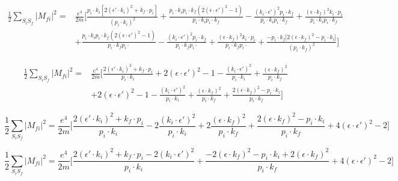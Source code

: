 \documentclass[a4]{article}
\begin{document}
    \begin{equation}
        \begin{aligned}
            \frac{1}{2} \sum_{S_i S_f} |M_{fi}|^2 = & \frac{e^4}{2m} \Bigg[ \frac{p_i \cdot k_i [2 (\epsilon' \cdot k_i)^2 + k_f \cdot p_i]}{(p_i \cdot k_i)^2} + \frac{p_i \cdot k_i p_i \cdot k_f (2 (\epsilon \cdot \epsilon')^2 - 1)}{p_i \cdot k_i p_i \cdot k_f} - \frac{(k_i \cdot \epsilon')^2 p_i \cdot k_f}{p_i \cdot k_i p_i \cdot k_f} + \frac{(\epsilon \cdot k_f)^2 k_i \cdot p_i}{p_i \cdot k_i p_i \cdot k_f} \\
            & + \frac{p_i \cdot k_i p_i \cdot k_f (2 (\epsilon \cdot \epsilon')^2 - 1)}{p_i \cdot k_f p_i \cdot} - \frac{(k_i \cdot \epsilon')^2 p_i \cdot k_f}{p_i \cdot k_f p_i \cdot} + \frac{(\epsilon \cdot k_f)^2 k_i \cdot p_i}{p_i \cdot k_f p_i \cdot} + \frac{- p_i \cdot k_f \big[ 2 (\epsilon \cdot k_f)^2 - p_i \cdot k_i \big]}{(p_i \cdot k_f)^2} \Bigg]
        \end{aligned}
    \end{equation}

    \begin{equation}
        \begin{aligned}
            \frac{1}{2} \sum_{S_i S_f} |M_{fi}|^2 = & \frac{e^4}{2m} \Bigg[ \frac{2 (\epsilon' \cdot k_i)^2 + k_f \cdot p_i}{p_i \cdot k_i} + 2 (\epsilon \cdot \epsilon')^2 - 1 - \frac{(k_i \cdot \epsilon')^2}{p_i \cdot k_i} + \frac{(\epsilon \cdot k_f)^2}{p_i \cdot k_f} \\
            & + 2 (\epsilon \cdot \epsilon')^2 - 1 - \frac{(k_i \cdot \epsilon')^2}{p_i \cdot k_i} + \frac{(\epsilon \cdot k_f)^2}{p_i \cdot k_f} + \frac{2 (\epsilon \cdot k_f)^2 - p_i \cdot k_i}{p_i \cdot k_f} \Bigg]
        \end{aligned}
    \end{equation}

    \begin{equation}
        \frac{1}{2} \sum_{S_i S_f} |M_{fi}|^2 = \frac{e^4}{2m} \Bigg[ \frac{2 (\epsilon' \cdot k_i)^2 + k_f \cdot p_i}{p_i \cdot k_i} - 2 \frac{(k_i \cdot \epsilon')^2}{p_i \cdot k_i} + 2 \frac{(\epsilon \cdot k_f)^2}{p_i \cdot k_f}
        + \frac{2 (\epsilon \cdot k_f)^2 - p_i \cdot k_i}{p_i \cdot k_f} + 4 (\epsilon \cdot \epsilon')^2 - 2 \Bigg]
    \end{equation}

    \begin{equation}
        \frac{1}{2} \sum_{S_i S_f} |M_{fi}|^2 = \frac{e^4}{2m} \Bigg[ \frac{2 (\epsilon' \cdot k_i)^2 + k_f \cdot p_i - 2 (k_i \cdot \epsilon')^2}{p_i \cdot k_i}
        + \frac{- 2 (\epsilon \cdot k_f)^2 - p_i \cdot k_i + 2 (\epsilon \cdot k_f)^2}{p_i \cdot k_f} + 4 (\epsilon \cdot \epsilon')^2 - 2 \Bigg]
    \end{equation}
\end{document}
